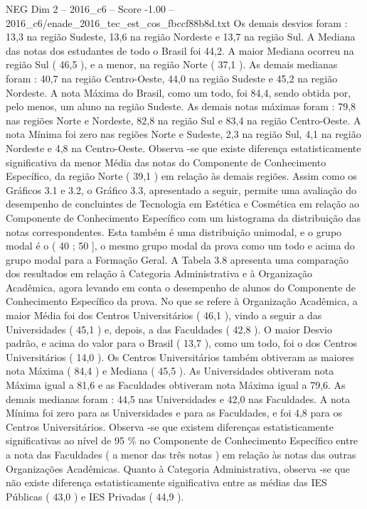 \begin{textsample}{NEG Dim 2 – 2016\_c6 – Score -1.00 – 2016\_c6/enade\_2016\_tec\_est\_cos\_fbccf88b8d.txt}
Os demais desvios foram : 13,3 na região Sudeste, 13,6 na região Nordeste e 13,7 na região Sul.
A Mediana das notas dos estudantes de todo o Brasil foi 44,2.
A maior Mediana ocorreu na região Sul ( 46,5 ), e a menor, na região Norte ( 37,1 ).
As demais medianas foram : 40,7 na região Centro-Oeste, 44,0 na região Sudeste e 45,2 na região Nordeste.
A nota Máxima do Brasil, como um todo, foi 84,4, sendo obtida por, pelo menos, um aluno na região Sudeste.
As demais notas máximas foram : 79,8 nas regiões Norte e Nordeste, 82,8 na região Sul e 83,4 na região Centro-Oeste.
A nota Mínima foi zero nas regiões Norte e Sudeste, 2,3 na região Sul, 4,1 na região Nordeste e 4,8 na Centro-Oeste.
Observa -se que existe diferença estatisticamente significativa da menor Média das notas do Componente de Conhecimento Específico, da região Norte ( 39,1 ) em relação às demais regiões.
Assim como os Gráficos 3.1 e 3.2, o Gráfico 3.3, apresentado a seguir, permite uma avaliação do desempenho de concluintes de Tecnologia em Estética e Cosmética em relação ao Componente de Conhecimento Específico com um histograma da distribuição das notas correspondentes.
Esta também é uma distribuição unimodal, e o grupo modal é o ( 40 ; 50 ], o mesmo grupo modal da prova como um todo e acima do grupo modal para a Formação Geral.
A Tabela 3.8 apresenta uma comparação dos resultados em relação à Categoria Administrativa e à Organização Acadêmica, agora levando em conta o desempenho de alunos do Componente de Conhecimento Específico da prova.
No que se refere à Organização Acadêmica, a maior Média foi dos Centros Universitários ( 46,1 ), vindo a seguir a das Universidades ( 45,1 ) e, depois, a das Faculdades ( 42,8 ).
O maior Desvio padrão, e acima do valor para o Brasil ( 13,7 ), como um todo, foi o dos Centros Universitários ( 14,0 ).
Os Centros Universitários também obtiveram as maiores nota Máxima ( 84,4 ) e Mediana ( 45,5 ).
As Universidades obtiveram nota Máxima igual a 81,6 e as Faculdades obtiveram nota Máxima igual a 79,6.
As demais medianas foram : 44,5 nas Universidades e 42,0 nas Faculdades.
A nota Mínima foi zero para as Universidades e para as Faculdades, e foi 4,8 para os Centros Universitários.
Observa -se que existem diferenças estatisticamente significativas ao nível de 95 \% no Componente de Conhecimento Específico entre a nota das Faculdades ( a menor das três notas ) em relação às notas das outras Organizações Acadêmicas.
Quanto à Categoria Administrativa, observa -se que não existe diferença estatisticamente significativa entre as médias das IES Públicas ( 43,0 ) e IES Privadas ( 44,9 ).

\end{textsample}
